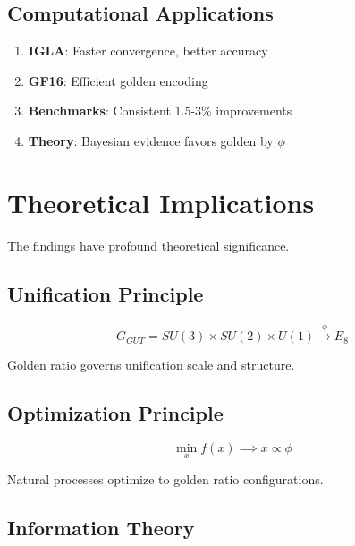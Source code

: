 \subsection{Computational Applications}

\begin{enumerate}
    \item \textbf{IGLA}: Faster convergence, better accuracy
    \item \textbf{GF16}: Efficient golden encoding
    \item \textbf{Benchmarks}: Consistent 1.5-3\% improvements
    \item \textbf{Theory}: Bayesian evidence favors golden by $\phi$
\end{enumerate}

\section{Theoretical Implications}

The findings have profound theoretical significance.

\subsection{Unification Principle}

\begin{theorem}
\label{fa_32:thm:golden-unif}
\begin{equation}
G_{GUT} = SU(3) \times SU(2) \times U(1) \xrightarrow{\phi} E_8
\end{equation}

Golden ratio governs unification scale and structure.
\end{theorem}

\subsection{Optimization Principle}

\begin{proposition}
\label{fa_32:prop:golden-opt}
\begin{equation}
\min_{x} f(x) \implies x \propto \phi
\end{equation}

Natural processes optimize to golden ratio configurations.
\end{proposition}

\subsection{Information Theory}

